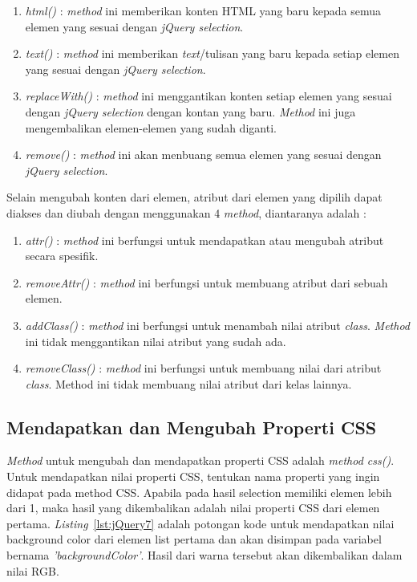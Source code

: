 \begin{enumerate}
	\item \textit{html()} : \textit{method} ini memberikan konten HTML yang baru kepada semua elemen yang sesuai dengan \textit{jQuery selection}.
	\item \textit{text()} : \textit{method} ini memberikan \textit{text}/tulisan yang baru kepada setiap elemen yang sesuai dengan \textit{jQuery selection}.
	\item \textit{replaceWith()} : \textit{method} ini menggantikan konten setiap elemen yang sesuai dengan \textit{jQuery selection} dengan kontan yang baru. \textit{Method} ini juga mengembalikan elemen-elemen yang sudah diganti.
	\item \textit{remove()} : \textit{method} ini akan menbuang semua elemen yang sesuai dengan \textit{jQuery selection}.
\end{enumerate}

Selain mengubah konten dari elemen, atribut dari elemen yang dipilih dapat diakses dan diubah dengan menggunakan 4 \textit{method}, diantaranya adalah :

\begin{enumerate}
	\item \textit{attr()} : \textit{method} ini berfungsi untuk mendapatkan atau mengubah atribut secara spesifik.
	\item \textit{removeAttr()} : \textit{method} ini berfungsi untuk membuang atribut dari sebuah elemen.
	\item \textit{addClass()} : \textit{method} ini berfungsi untuk menambah nilai atribut \textit{class}. \textit{Method} ini tidak menggantikan nilai atribut yang sudah ada.
	\item \textit{removeClass()} : \textit{method} ini berfungsi untuk membuang nilai dari atribut \textit{class}. Method ini tidak membuang nilai atribut dari kelas lainnya.
\end{enumerate}

\subsection{Mendapatkan dan Mengubah Properti CSS}
\textit{Method} untuk mengubah dan mendapatkan properti CSS adalah \textit{method css()}. Untuk mendapatkan nilai properti CSS, tentukan nama properti yang ingin didapat pada method CSS. Apabila pada hasil selection memiliki elemen lebih dari 1, maka hasil yang dikembalikan adalah nilai properti CSS dari elemen pertama. \textit{Listing}~\ref{lst:jQuery7} adalah potongan kode untuk mendapatkan nilai background color dari elemen list pertama dan akan disimpan pada variabel bernama \textit{'backgroundColor'}. Hasil dari warna tersebut akan dikembalikan dalam nilai RGB. 

